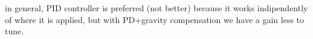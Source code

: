 in general, PID controller is preferred (not better) because it works indipendently of where it is applied, but with PD+gravity compensation we have a gain less to tune.





































